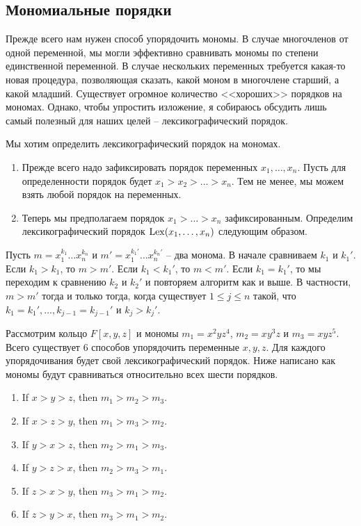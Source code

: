 \subsection{Мономиальные порядки}

Прежде всего нам нужен способ упорядочить мономы.
В случае многочленов от одной переменной, мы могли эффективно сравнивать мономы по степени единственной переменной.
В случае нескольких переменных требуется какая-то новая процедура, позволяющая сказать, какой моном в многочлене старший, а какой младший.
Существует огромное количество <<хороших>> порядков на мономах.
Однако, чтобы упростить изложение, я собираюсь обсудить лишь самый полезный для наших целей -- лексикографический порядок.

\begin{definition}
\label{def::Lex}
Мы хотим определить лексикографический порядок на мономах.
\begin{enumerate}
\item Прежде всего надо зафиксировать порядок переменных $x_1,\ldots,x_n$.
Пусть для определенности порядок будет $x_1 > x_2 > \ldots > x_n$.
Тем не менее, мы можем взять любой порядок на переменных.

\item Теперь мы предполагаем порядок $x_1 > \ldots > x_n$ зафиксированным.
Определим лексикографический порядок $\operatorname{Lex}(x_1,\ldots,x_n)$ следующим образом.
\end{enumerate}
Пусть $m = x_1^{k_1}\ldots x_n^{k_n}$ и $m'= x_1^{k_1'}\ldots x_n^{k_n'}$ -- два монома.
В начале сравниваем $k_1$ и $k_1'$.
Если $k_1 > k_1$, то $m > m'$.
Если $k_1 < k_1'$, то $m < m'$.
Если $k_1 = k_1'$, то мы переходим к сравнению $k_2$ и $k_2'$ и повторяем алгоритм как и выше.
В частности, $m > m'$ тогда и только тогда, когда существует $1\leqslant j \leqslant n$ такой, что $k_1 = k_1',\ldots, k_{j-1} = k_{j-1}'$ и $k_j > k_j'$.
\end{definition}

\begin{examples}
Рассмотрим кольцо $F[x, y, z]$ и мономы $m_1 = x^2 y z^4$, $m_2 = x y^3 z$ и $m_3 = x y z^5$.
Всего существует $6$ способов упорядочить переменные $x, y, z$.
Для каждого упорядочивания будет свой лексикографический порядок.
Ниже написано как мономы будут сравниваться относительно всех шести порядков.
\begin{enumerate}
\item If $x > y > z$, then $m_1 > m_2 > m_3$.

\item If $x > z > y$, then $m_1 > m_3 > m_2$.

\item If $y > x > z$, then $m_2 > m_1 > m_3$.

\item If $y > z > x$, then $m_2 > m_3 > m_1$.

\item If $z > x > y$, then $m_3 > m_1 > m_2$.

\item If $z > y > x$, then $m_3 > m_1 > m_2$.
\end{enumerate}
\end{examples}


